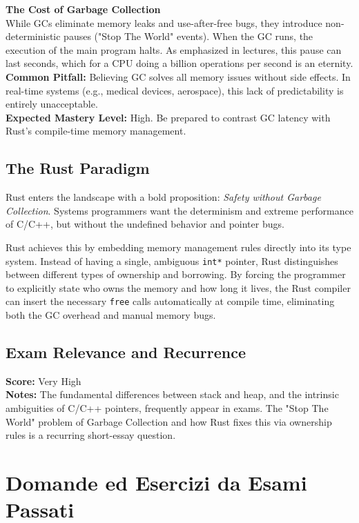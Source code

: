 \begin{examprioritybox}
\textbf{The Cost of Garbage Collection} \\
While GCs eliminate memory leaks and use-after-free bugs, they introduce non-deterministic pauses ("Stop The World" events). When the GC runs, the execution of the main program halts. As emphasized in lectures, this pause can last seconds, which for a CPU doing a billion operations per second is an eternity. \\
\textbf{Common Pitfall:} Believing GC solves all memory issues without side effects. In real-time systems (e.g., medical devices, aerospace), this lack of predictability is entirely unacceptable. \\
\textbf{Expected Mastery Level:} High. Be prepared to contrast GC latency with Rust's compile-time memory management.
\end{examprioritybox}

\subsection{The Rust Paradigm}
Rust enters the landscape with a bold proposition: \textit{Safety without Garbage Collection}. Systems programmers want the determinism and extreme performance of C/C++, but without the undefined behavior and pointer bugs. 

Rust achieves this by embedding memory management rules directly into its type system. Instead of having a single, ambiguous \texttt{int*} pointer, Rust distinguishes between different types of ownership and borrowing. By forcing the programmer to explicitly state who owns the memory and how long it lives, the Rust compiler can insert the necessary \texttt{free} calls automatically at compile time, eliminating both the GC overhead and manual memory bugs.

\subsection*{Exam Relevance and Recurrence}
\textbf{Score:} Very High \\
\textbf{Notes:} The fundamental differences between stack and heap, and the intrinsic ambiguities of C/C++ pointers, frequently appear in exams. The "Stop The World" problem of Garbage Collection and how Rust fixes this via ownership rules is a recurring short-essay question.

\section{Domande ed Esercizi da Esami Passati}

